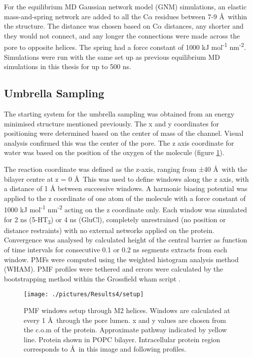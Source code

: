 For the equilibrium MD Gaussian network model (GNM) simulations, an elastic mass-and-spring network are added \cite{Atilgan2001b} to all the C$\alpha$ residues between 7-9 \AA\ within the structure. The distance was chosen based on C$\alpha$ distances, any shorter and they would not connect, and any longer the connections were made across the pore to opposite helices. The spring had a force constant of 1000 kJ mol\textsuperscript{-1} nm\textsuperscript{-2}. Simulations were run with the same set up as previous equilibrium MD simulations in this thesis for up to 500 ns. 

\subsection{Umbrella Sampling}

The starting system for the umbrella sampling was obtained from an energy minimised structure mentioned previously. The x and y coordinates for positioning were determined based on the center of mass of the channel. Visual analysis confirmed this was the center of the pore. The z axis coordinate for water was based on the position of the oxygen of the molecule (figure \ref{fig:setup_rc4}).

The reaction coordinate was defined as the z-axis, ranging from \til ±40 \AA\ with the bilayer centre at z = 0 \AA\  This was used to define  windows along the z axis, with a distance of 1 Å between successive windows. A harmonic biasing potential was applied to the z coordinate of one atom of the molecule with a force constant of 1000 kJ mol\textsuperscript{-1} nm\textsuperscript{-2} acting on the z coordinate only. Each window was simulated for 2 ns (5-HT\textsubscript{3}) or 4 ns (GluCl), completely unrestrained (no position or distance restraints) with no external networks applied on the protein. Convergence was analysed by calculated height of the central barrier as function of time intervals for consecutive 0.1 or 0.2 ns segments extracts from each window. PMFs were computed using the weighted histogram analysis method (WHAM). PMF profiles were tethered and errors were calculated by the bootstrapping method within the Grossfield wham script \cite{Grossfield2006}. 

\begin{figure}[H]
\begin{center}
\texttt{[image: ./pictures/Results4/setup]}
\caption[PMF windows setup through M2 helices.] {PMF windows setup through M2 helices. Windows are calculated at every 1 \AA\ through the pore lumen. x and y values are chosen from the c.o.m of the protein. Approximate pathway indicated by yellow line. Protein shown in POPC bilayer. Intracellular protein region corresponds to   \AA\ in this image and following profiles.}
\label{fig:setup_rc4}
\end{center}
\end{figure}

